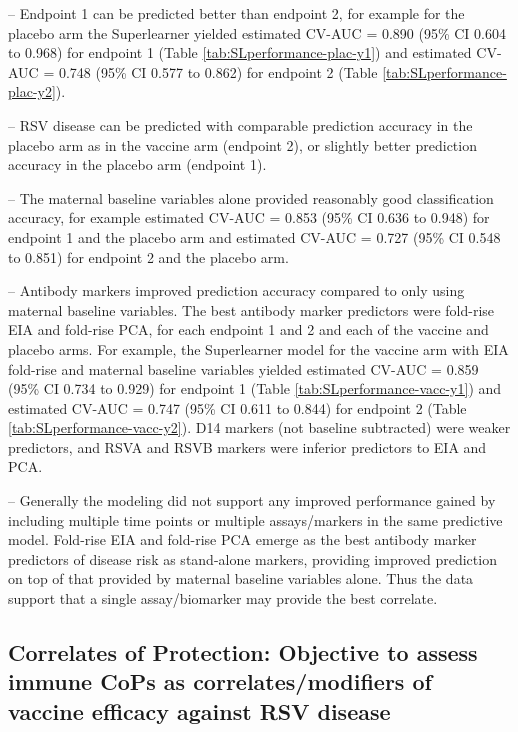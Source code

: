 \documentclass[11pt]{article}
\begin{document}
-- Endpoint 1 can be predicted better than endpoint 2, for example for the placebo arm the Superlearner yielded estimated CV-AUC = 0.890 (95\% CI 0.604 to 0.968)
for endpoint 1 (Table \ref{tab:SLperformance-plac-y1}) and estimated CV-AUC = 0.748 (95\% CI 0.577 to 0.862) for endpoint 2
(Table \ref{tab:SLperformance-plac-y2}).

-- RSV disease can be predicted with comparable prediction accuracy in the placebo arm as in the vaccine arm (endpoint 2), or slightly better prediction accuracy in the placebo arm (endpoint 1).

-- The maternal baseline variables alone provided reasonably good classification accuracy, for example estimated CV-AUC = 0.853 (95\% CI 0.636 to 0.948) for endpoint 1 and the placebo arm and estimated CV-AUC = 0.727 (95\% CI 0.548 to 0.851) for endpoint 2 and the placebo arm.

-- Antibody markers improved prediction accuracy compared to only using maternal baseline variables. The best antibody marker predictors were fold-rise EIA and fold-rise PCA, for each endpoint 1 and 2 and each of the vaccine and placebo arms. For example, the Superlearner model for the vaccine arm with EIA fold-rise and maternal baseline variables yielded estimated CV-AUC = 0.859 (95\% CI 0.734 to 0.929) for endpoint 1 (Table \ref{tab:SLperformance-vacc-y1})
and estimated CV-AUC = 0.747 (95\% CI 0.611 to 0.844) for endpoint 2 (Table \ref{tab:SLperformance-vacc-y2}).
D14 markers (not baseline subtracted) were weaker predictors, and RSVA and RSVB markers were inferior predictors to EIA and PCA.

-- Generally the modeling did not support any improved performance gained by including multiple time points or multiple assays/markers in the same predictive model. Fold-rise EIA and fold-rise PCA emerge as the best antibody marker predictors of disease risk as stand-alone markers, providing improved prediction on top of that provided by maternal baseline variables alone. Thus the data support that a single assay/biomarker may provide the best correlate.

\hypertarget{correlates-of-protection-objective-to-assess-immune-cops-as-correlatesmodifiers-of-vaccine-efficacy-against-rsv-disease}{%
\subsection{Correlates of Protection: Objective to assess immune CoPs as correlates/modifiers of vaccine efficacy against RSV disease}\label{correlates-of-protection-objective-to-assess-immune-cops-as-correlatesmodifiers-of-vaccine-efficacy-against-rsv-disease}}
\end{document}
